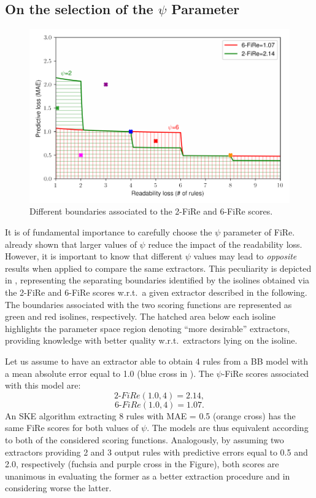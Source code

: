 \documentclass{article}
\newcommand{\fire}{FiRe}
\newcommand{\psifire}{$\psi$-\fire}
\begin{document}
\subsection{On the selection of the $\psi$ Parameter}

\begin{figure}
	\centering
	\includegraphics[width=\linewidth]{figures/areas.pdf}
	\caption{Different boundaries associated to the 2-\fire{} and 6-\fire{} scores.}\label{fig:areas}
\end{figure}

It is of fundamental importance to carefully choose the $\psi$ parameter of \fire{}.
%
 already shown that larger values of $\psi$ reduce the impact of the readability loss.
%
However, it is important to know that different $\psi$ values may lead to \emph{opposite} results when applied to compare the same extractors.
%
This peculiarity is depicted in , representing the separating boundaries identified by the isolines obtained via the 2-\fire{} and 6-\fire{} scores w.r.t.\ a given extractor described in the following.
%
The boundaries associated with the two scoring functions are represented as green and red isolines, respectively.
%
The hatched area below each isoline highlights the parameter space region denoting ``more desirable'' extractors, providing knowledge with better quality w.r.t.\ extractors lying on the isoline.

Let us assume to have an extractor able to obtain 4 rules from a BB model with a mean absolute error equal to 1.0 (blue cross in ).
%
The \psifire{} scores associated with this model are:
%
\begin{equation*}
	2\textrm{-}\fire(1.0, 4)=2.14,
\end{equation*}
%
\begin{equation*}
	6\textrm{-}\fire(1.0, 4)=1.07.
\end{equation*}
%
An SKE algorithm extracting 8 rules with MAE = 0.5 (orange cross) has the same \fire{} scores for both values of $\psi$.
%
The models are thus equivalent according to both of the considered scoring functions.
%
Analogously, by assuming two extractors providing 2 and 3 output rules with predictive errors equal to 0.5 and 2.0, respectively (fuchsia and purple cross in the Figure), both scores are unanimous in evaluating the former as a better extraction procedure and in considering worse the latter.
\end{document}
